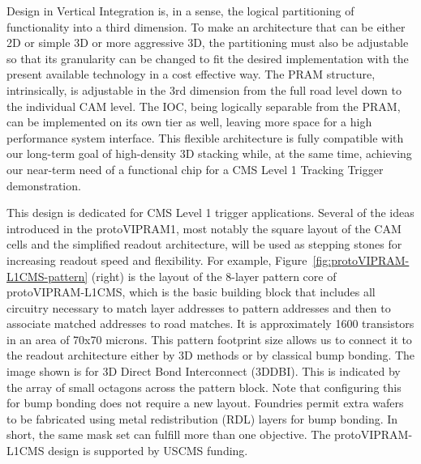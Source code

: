 Design in Vertical Integration is, in a sense, the logical partitioning of functionality into a third dimension. To make an architecture that can be either 2D or simple 3D or more aggressive 3D, the partitioning must also be adjustable so that its granularity can be changed to fit the desired implementation with the present available technology in a cost effective way.  The PRAM structure, intrinsically, is adjustable in the 3rd dimension from the full road level down to the individual CAM level.  The IOC, being logically separable from the PRAM, can be implemented on its own tier as well, leaving more space for a high performance system interface. This flexible architecture is fully compatible with our long-term goal of high-density 3D stacking while, at the same time, achieving our near-term need of a functional chip for a CMS Level 1 Tracking Trigger demonstration.

This design is dedicated for CMS Level 1 trigger applications.  Several of the ideas introduced in the protoVIPRAM1, most notably the square layout of the CAM cells and the simplified readout architecture, will be used as stepping stones for increasing readout speed and flexibility. For example, Figure~\ref{fig:protoVIPRAM-L1CMS-pattern} (right) is the layout of the 8-layer pattern core of protoVIPRAM-L1CMS, which is the basic building block that includes all circuitry necessary to match layer addresses to pattern addresses and then to associate matched addresses to road matches.  It is approximately 1600 transistors in an area of 70x70 microns.  
This pattern footprint size allows us to connect it to the readout architecture either by 3D methods or by classical bump bonding.  The image shown is for 3D Direct Bond Interconnect (3DDBI).  This is indicated by the array of small octagons across the pattern block.  Note that configuring this for bump bonding does not require a new layout.  Foundries permit extra wafers to be fabricated using metal redistribution (RDL) layers for bump bonding.  In short, the same mask set can fulfill more than one objective. The protoVIPRAM-L1CMS design is supported by USCMS funding. 




